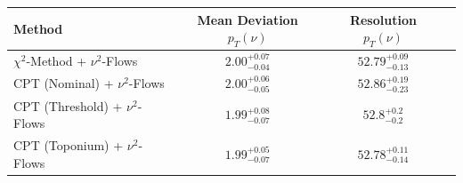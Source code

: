     \begin{tabular}{lccc}
        \toprule
        Method & Mean Deviation $p_{T}({\nu})$ & Resolution $p_{T}({\nu})$ \\
        \midrule
        $\chi^2$-Method + $\nu^2$-Flows & $2.00^{+0.07}_{-0.04}$ & $52.79^{+0.09}_{-0.13}$ \\
        CPT (Nominal) + $\nu^2$-Flows & $2.00^{+0.06}_{-0.05}$ & $52.86^{+0.19}_{-0.23}$ \\
        CPT (Threshold) + $\nu^2$-Flows & $1.99^{+0.08}_{-0.07}$ & $52.8^{+0.2}_{-0.2}$ \\
        CPT (Toponium) + $\nu^2$-Flows & $1.99^{+0.05}_{-0.07}$ & $52.78^{+0.11}_{-0.14}$ \\
        \bottomrule
    \end{tabular}